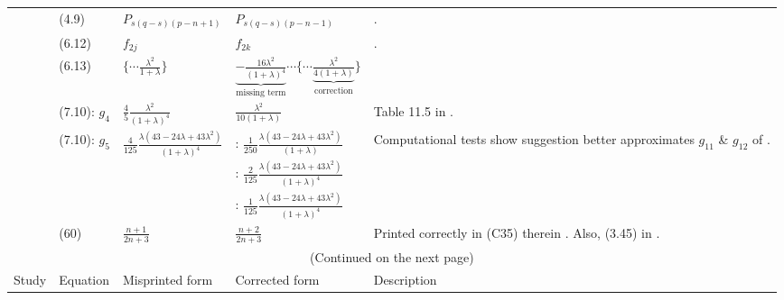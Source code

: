 \documentclass[../thesis.tex]{subfiles}
\begin{document}
\begin{landscape}
\begin{longtable}{p{3cm}p{3cm}p{5.0cm}p{5.25cm}p{5.5cm}}
 \multirow[t]{7}{3cm}{\citet{JO84}} & (4.9) & $P_{s(q-s)(p-n+1)}$ & $P_{s(q-s)(p-n-1)}$ & \citep{RWMG11,T17,I}.
 \\ \cline{2-5}
 & (6.12) & $f_{2j}$ & $f_{2k}$ & \multirow[c]{2}{5.5cm}{\citet{I}.}
 \\ \cline{2-4}
 & (6.13) & $\Big\{\cdots\frac{\lambda^2}{1+\lambda}\Big\}$ & $\underbrace{-\tfrac{16\lambda^2}{(1+\lambda)^4}}_\text{missing term}\cdots\Big\{\cdots\underbrace{\tfrac{\lambda^2}{4(1+\lambda)}}_\text{correction}\Big\}$ & 
 \\ \cline{2-5}
  & (7.10): $g_4$ & $\frac{4}{5}\frac{\lambda^2}{(1+\lambda)^4}$ & $\frac{\lambda^2}{10(1+\lambda)}$ & Table 11.5 in \citet{KK13}.
 \\ \cline{2-5}
 & \multirow[t]{3}{3cm}{(7.10): $g_5$} & \multirow[t]{3}{5.25cm}{$\frac{4}{125}\frac{\lambda(43-24\lambda+43\lambda^2)}{(1+\lambda)^4}$} & \cite{KK13}: $\frac{1}{250}\frac{\lambda(43-24\lambda+43\lambda^2)}{(1+\lambda)}$ & \multirow[t]{3}{5.5cm}{Computational tests show \citet{I} suggestion better approximates $g_{11}$ \& $g_{12}$ of \citet{ONM70}.} \\
 & & & \cite{L90}: $\frac{2}{125}\frac{\lambda(43-24\lambda+43\lambda^2)}{(1+\lambda)^4}$ & \\
 & & & \cite{I}: $\frac{1}{125}\frac{\lambda(43-24\lambda+43\lambda^2)}{(1+\lambda)^4}$ & 
 \\ \hline
 
 \citet{GMS20} & (60) & $\frac{n+1}{2n+3}$ & $\frac{n+2}{2n+3}$ & Printed correctly in (C35) therein \cite{GMS20}. Also, (3.45) in \cite{GCB66}.
 \\ \hline
 
 \multicolumn{5}{c}{(Continued on the next page)}%
 \\ \newpage \hline								 %
 Study & Equation & Misprinted form & Corrected  %
 form & Description \\ \hline					 %
 

\end{longtable}
\end{landscape}
\end{document}
